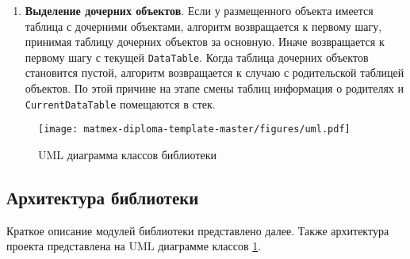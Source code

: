 \begin{enumerate}
    \item \textbf{Выделение дочерних объектов}. Если у размещенного объекта имеется таблица с дочерними объектами, алгоритм возвращается к первому шагу, принимая таблицу дочерних объектов за основную. Иначе возвращается к первому шагу с текущей \texttt{DataTable}. Когда таблица дочерних объектов становится пустой, алгоритм возвращается к случаю с родительской таблицей объектов. По этой причине на этапе смены таблиц информация о родителях и \texttt{CurrentDataTable} помещаются в стек.
    
\end{enumerate}

\begin{figure}
    \centering
    \texttt{[image: matmex-diploma-template-master/figures/uml.pdf]}
    \caption{UML диаграмма классов библиотеки}
    \label{fig:uml}
\end{figure}

\subsection{Архитектура библиотеки}

Краткое описание модулей библиотеки представлено далее. Также архитектура проекта представлена на UML диаграмме классов \ref{fig:uml}. 

